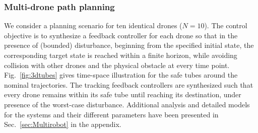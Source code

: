 \subsubsection{Multi-drone path planning}\label{subsec:Multirobot}
We consider a planning scenario for ten identical drones ($N=10$). 
The control objective is to synthesize a feedback controller for each drone so that in the presence of (bounded) disturbance, beginning from the specified initial state, the corresponding target state is reached within a finite horizon, while avoiding collision with other drones and the physical obstacle at every time point. Fig.~\ref{fig:3dtubes} gives time-space illustration for the safe tubes around the nominal trajectories. The tracking feedback controllers are synthesized such that every drone remains within its safe tube until reaching its destination, under presence of the worst-case disturbance.  Additional analysis and detailed models for the systems and their different parameters have been presented in Sec.~\ref{sec:Multirobot} in the appendix.
